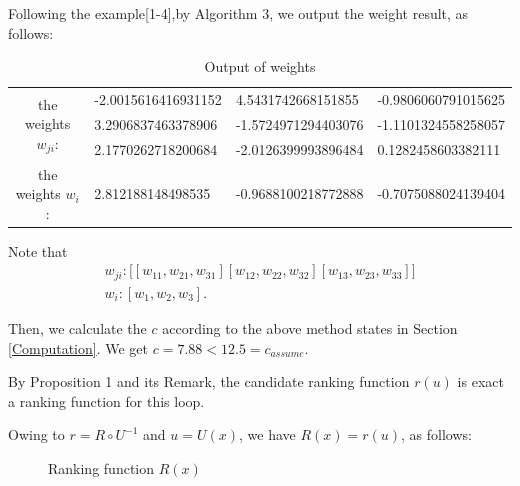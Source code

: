 \begin{exam}\label{exm6}
	
	Following the example[1-4],by Algorithm 3, we output the weight result, as follows: 
	
	\begin{table}[H]{\label{output of weights}}
		\begin{center}
			\setlength{\abovecaptionskip}{0pt}   
			\setlength{\belowcaptionskip}{0pt}
			\caption{Output of weights}
			\begin{tabular}{|c|lll|}
				\hline
				\multirow{3}{*}{the weights $w_{ji}$:} &  -2.0015616416931152 & 4.5431742668151855  & -0.9806060791015625   \\
				& 3.2906837463378906   & -1.5724971294403076  & -1.1101324558258057  \\
				& 2.1770262718200684  & -2.0126399993896484 & 0.1282458603382111 \\
				\hline the weights $w_{i}$:&  2.812188148498535   & -0.9688100218772888  & -0.7075088024139404 \\ \hline
			\end{tabular}
		\end{center}
	\end{table}
	Note that
	\begin{equation}\label{equ:weight}
	\begin{array}{l}
	{w_{ji}}:\left.[[{w_{11}},{w_{21}},{w_{31}}][{w_{12}},{w_{22}},{w_{32}}] [{w_{13}},{w_{23}},{w_{33}}] \right.]\\
	{w_i}:[{w_1},{w_2},{w_3}].
	\end{array}
	\end{equation}
	
	Then, we calculate the $c$ according to the above method states in Section \ref{Computation}. We get
	$c = {7.88 < 12.5 = c_{assume}}$.
	
	By Proposition 1 and its Remark, the candidate ranking function $r(u)$ is exact a ranking function for this loop. 
	
	Owing to $r=R\circ U^{-1}$ and $u=U(x)$, we have $R(x)=r(u)$, as follows:
	\begin{figure}[H] 
		\caption{\label{result1} Ranking function $R(x)$}
	\end{figure}
\end{exam}

